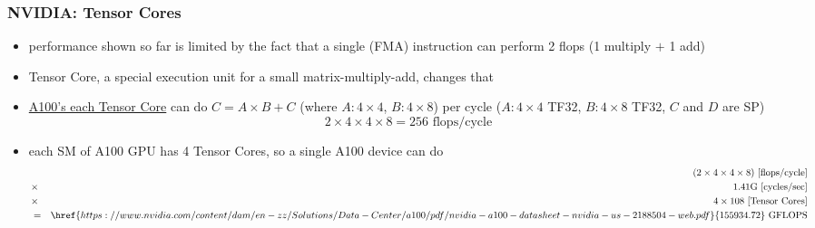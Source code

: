 \documentclass[12pt,dvipdfmx]{beamer}
\begin{document}
\begin{frame}
\frametitle{NVIDIA: Tensor Cores}
\begin{itemize}
\item performance shown so far is limited by the fact that
  a single (FMA) instruction can perform 2 flops (1 multiply $+$ 1 add)
\item Tensor Core, a special execution unit for a small matrix-multiply-add, changes that
\item \href{https://images.nvidia.com/aem-dam/en-zz/Solutions/data-center/nvidia-ampere-architecture-whitepaper.pdf}{A100's each Tensor Core} can do $C = A \times B + C$ (where $A : 4\times 4$, $B : 4 \times 8$)
  per cycle ($A : 4 \times 4$ TF32, $B : 4 \times 8$ TF32, $C$ and $D$ are SP)
  \[ 2 \times 4 \times 4 \times 8 = 256 \mbox{ flops/cycle} \]
\item each SM of A100 GPU has 4 Tensor Cores, so a single A100 device can do
  \begin{eqnarray*}
    &        & (2 \times 4 \times 4 \times 8) \mbox{ [flops/cycle]} \\
    & \times & 1.41\mbox{G [cycles/sec]} \\
    & \times & 4 \times 108 \mbox{ [Tensor Cores]} \\
    & = &      \href{https://www.nvidia.com/content/dam/en-zz/Solutions/Data-Center/a100/pdf/nvidia-a100-datasheet-nvidia-us-2188504-web.pdf}{155934.72} \mbox{ GFLOPS}
  \end{eqnarray*}
\end{itemize}
\end{frame}

\end{document}
